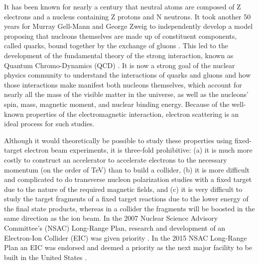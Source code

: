 \label{ch:eic}
It has been known for nearly a century that neutral atoms are composed of Z electrons and a nucleus containing Z protons and N neutrons. It took another 50 years for Murray Gell-Mann and George Zweig to independently develop a model proposing that nucleons themselves are made up of constituent components, called quarks, bound together by the exchange of gluons \cite{SymmetryBreaking}. This led to the development of the fundamental theory of the strong interaction, known as Quantum Chromo-Dynamics (QCD) \cite{QCDdiscovery}. It is now a strong goal of the nuclear physics community to understand the interactions of quarks and gluons and how those interactions make manifest both nucleons themselves, which account for nearly all the mass of the visible matter in the universe, as well as the nucleons' spin, mass, magnetic moment, and nuclear binding energy. Because of the well-known properties of the electromagnetic interaction, electron scattering is an ideal process for such studies. 

Although it would theoretically be possible to study these properties using fixed-target electron beam experiments, it is three-fold prohibitive: (a) it is much more costly to construct an accelerator to accelerate electrons to the necessary momentum (on the order of TeV) than to build a collider, (b) it is more difficult and complicated to do transverse nucleon polarization studies with a fixed target due to the nature of the required magnetic fields, and (c) it is very difficult to study the target fragments of a fixed target reactions due to the lower energy of the final state products, whereas in a collider the fragments will be boosted in the same direction as the ion beam. In the 2007 Nuclear Science Advisory Committee's (NSAC) Long-Range Plan, research and development of an Electron-Ion Collider (EIC) was given priority \cite{NSAC2007}. In the 2015 NSAC Long-Range Plan an EIC was endorsed and deemed a priority as the next major facility to be built in the United States \cite{NSAC2015}.

